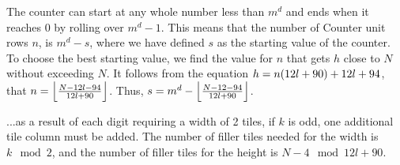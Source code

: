 %
The counter can start at any whole number less than $m^d$ and ends when it reaches 0 by rolling over $m^d - 1$.
%
This means that the number of Counter unit rows $n$, is $m^d - s$, where we have defined $s$ as the starting value of the counter.
%
To choose the best starting value, we find the value for $n$ that gets $h$ close to $N$ without exceeding $N$.
%
It follows from the equation $h = n(\rowheight) + \seedheight$, that $n = \floor*{\frac{N - 12l - 94}{\rowheight}}$.
%
Thus, $s = m^d - \floor*{\frac{N - 12 - 94}{\rowheight}}$.

%
...as a result of each digit requiring a width of 2 tiles, if $k$ is odd, one additional tile column must be added.
%
The number of filler tiles needed for the width is $k \mod 2$, and the number of filler tiles for the height is $N - 4 \mod 12l + 90$.
%

